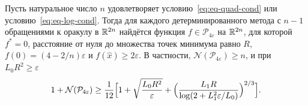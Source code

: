 \begin{theorem}\label{thm:lower-gap}
Пусть натуральное число $n$ удовлетворяет условию~\eqref{eq:eq-quad-cond} или условию~\eqref{eq:eq-log-cond}. Тогда для каждого детерминированного метода с $n-1$ обращениями к оракулу в $\mathbb R^{2n}$ найдётся функция $f\in\mathcal P_{4\varepsilon}$ на $\mathbb R^{2n}$, для которой $f^\ast=0$, расстояние от нуля до множества точек минимума равно $R$, $f(0)=(4-2/n)\varepsilon$ и $f(\hat x)\ge2\varepsilon$. В частности, $\mathcal N(\mathcal P_{4\varepsilon})\ge n$, и при $L_0R^2\ge\varepsilon$
\begin{equation}\label{eq:lower-gap}
 1+\mathcal N(\mathcal P_{4\varepsilon})\ge\frac1{12}\Bigl[1+\sqrt{\frac{L_0R^2}\varepsilon}+\Bigl(\frac{L_1R}{\log(2+L_1^2\varepsilon/L_0)}\Bigr)^{2/3}\Bigr].
\end{equation}
\end{theorem}

